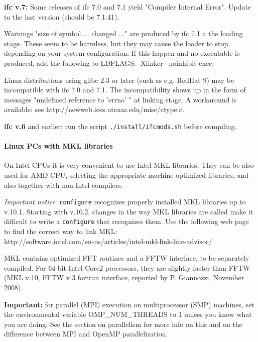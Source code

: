 \documentclass[12pt,a4paper]{article}
\begin{document}
{\bf ifc v.7:} Some releases of ifc 7.0 and 7.1 yield "Compiler
Internal Error". Update to the last version (should be 7.1.41).

Warnings "size of symbol ... changed ..." are produced by ifc 7.1 a
the loading stage. These seem to be harmless, but they may cause the
loader to stop, depending on your system configuration. If this happen
and no executable is produced, add the following to LDFLAGS: -Xlinker
--noinhibit-exec. 

Linux distributions using glibc 2.3 or later (such as e.g. RedHat 9) may be
incompatible with ifc 7.0 and 7.1. The incompatibility shows up in the form
of messages "undefined reference to 'errno' " at linking stage. A workaround
is available: see http://newweb.ices.utexas.edu/misc/ctype.c.

{\bf ifc v.6} and earlier: run the script \texttt{./install/ifcmods.sh}
before compiling.

\paragraph{Linux PCs with MKL libraries}
On Intel CPUs it is very convenient to use Intel MKL libraries. They can be
also used for AMD CPU, selecting the appropriate machine-optimized
libraries, and also together with non-Intel compilers.

{\em Important notice}: \texttt{configure} recognizes properly installed
MKL libraries up to v.10.1. Starting with v.10.2, changes in the way
MKL libraries are called make it difficult to write a \texttt{configure}
that recognizes them. Use the following web page to find the correct way 
to link MKL:\\
http://software.intel.com/en-us/articles/intel-mkl-link-line-advisor/

MKL contains optimized FFT routines and a FFTW interface, to be separately
compiled. For 64-bit Intel Core2 processors, they are slightly faster than 
FFTW (MKL v.10, FFTW v.3 fortran interface, reported by P. Giannozzi,
November 2008). 

{\bf Important:} for parallel (MPI) execution on multiprocessor (SMP)
machines, set the environmental variable OMP\_NUM\_THREADS 
to 1 unless you know what you are doing. See the section  on
parallelism for more info on this
and on the difference between MPI and OpenMP parallelization. 
\end{document}
